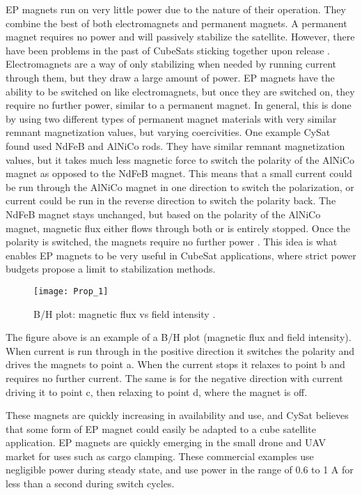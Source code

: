 \documentclass[nocover]            %
{CSLI}                       %
\begin{document}
EP magnets run on very little power due to the nature of their operation. They combine the best of both electromagnets and permanent magnets. A permanent magnet requires no power and will passively stabilize the satellite. However, there have been problems in the past of CubeSats sticking together upon release \cite{Knaian}. Electromagnets are a way of only stabilizing when needed by running current through them, but they draw a large amount of power. EP magnets have the ability to be switched on like electromagnets, but once they are switched on, they require no further power, similar to a permanent magnet. In general, this is done by using two different types of permanent magnet materials with very similar remnant magnetization values, but varying coercivities. One example CySat found \cite{Gilpin} used NdFeB and AlNiCo rods. They have similar remnant magnetization values, but it takes much less magnetic force to switch the polarity of the AlNiCo magnet as opposed to the NdFeB magnet. This means that a small current could be run through the AlNiCo magnet in one direction to switch the polarization, or current could be run in the reverse direction to switch the polarity back. The NdFeB magnet stays unchanged, but based on the polarity of the AlNiCo magnet, magnetic flux either flows through both or is entirely stopped. Once the polarity is switched, the magnets require no further power \cite{Gilpin}. This idea is what enables EP magnets to be very useful in CubeSat applications, where strict power budgets propose a limit to stabilization methods.

\begin{figure}[H]
\centering
    \texttt{[image: Prop\_1]}
    \caption{B/H plot: magnetic flux vs field intensity \cite{Gilpin}.}
\end{figure}

The figure above is an example of a B/H plot (magnetic flux and field intensity). When current is run through in the positive direction it switches the polarity and drives the magnets to point a. When the current stops it relaxes to point b and requires no further current. The same is for the negative direction with current driving it to point c, then relaxing to point d, where the magnet is off.

These magnets are quickly increasing in availability and use, and CySat believes that some form of EP magnet could easily be adapted to a cube satellite application. EP magnets are quickly emerging in the small drone and UAV market for uses such as cargo clamping. These commercial examples use negligible power during steady state, and use power in the range of 0.6 to 1 A for less than a second during switch cycles.
\end{document}

